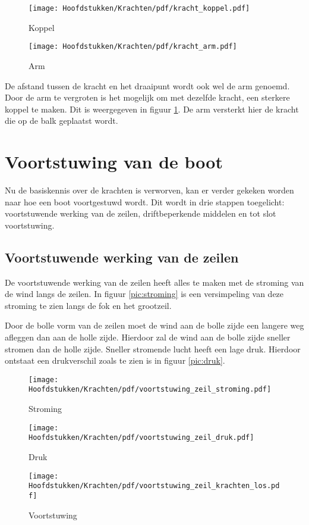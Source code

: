 \begin{figure}[H]
	\centering
	\begin{minipage}[b]{0.49\textwidth}
		\centering
		\texttt{[image: Hoofdstukken/Krachten/pdf/kracht\_koppel.pdf]}
		\caption{Koppel}
		\label{pic:koppel}
	\end{minipage}
	\hfill
	\begin{minipage}[b]{0.49\textwidth}
		\centering
		\texttt{[image: Hoofdstukken/Krachten/pdf/kracht\_arm.pdf]}
		\caption{Arm}
		\label{pic:arm}
	\end{minipage}
\end{figure}
De afstand tussen de kracht en het draaipunt wordt ook wel de arm genoemd. Door de arm te vergroten is het mogelijk om met dezelfde kracht, een sterkere koppel te maken. Dit is weergegeven in figuur \ref{pic:arm}. De arm versterkt hier de kracht die op de balk geplaatst wordt.

\section{Voortstuwing van de boot}
Nu de basiskennis over de krachten is verworven, kan er verder gekeken worden naar hoe een boot voortgestuwd wordt. Dit wordt in drie stappen toegelicht: voortstuwende werking van de zeilen, driftbeperkende middelen en tot slot voortstuwing.

\subsection*{Voortstuwende werking van de zeilen}
De voortstuwende werking van de zeilen heeft alles te maken met de stroming van de wind langs de zeilen. In figuur \ref{pic:stroming} is een versimpeling van deze stroming te zien langs de fok en het grootzeil. 

Door de bolle vorm van de zeilen moet de wind aan de bolle zijde een langere weg afleggen dan aan de holle zijde. Hierdoor zal de wind aan de bolle zijde sneller stromen dan de holle zijde. Sneller stromende lucht heeft een lage druk. Hierdoor ontstaat een drukverschil zoals te zien is in figuur \ref{pic:druk}.

\begin{figure}[H]
	\centering
	\begin{minipage}[b]{0.32\textwidth}
		\centering
		\texttt{[image: Hoofdstukken/Krachten/pdf/voortstuwing\_zeil\_stroming.pdf]}
		\caption{Stroming}
		\label{pic:stroming}
	\end{minipage}
	\hfill
	\begin{minipage}[b]{0.32\textwidth}
		\centering
		\texttt{[image: Hoofdstukken/Krachten/pdf/voortstuwing\_zeil\_druk.pdf]}
		\caption{Druk}
		\label{pic:druk}
	\end{minipage}
	\hfill
	\begin{minipage}[b]{0.32\textwidth}
		\centering
		\texttt{[image: Hoofdstukken/Krachten/pdf/voortstuwing\_zeil\_krachten\_los.pdf]}
		\caption{Voortstuwing}
		\label{pic:stuwing}
	\end{minipage}
\end{figure}

